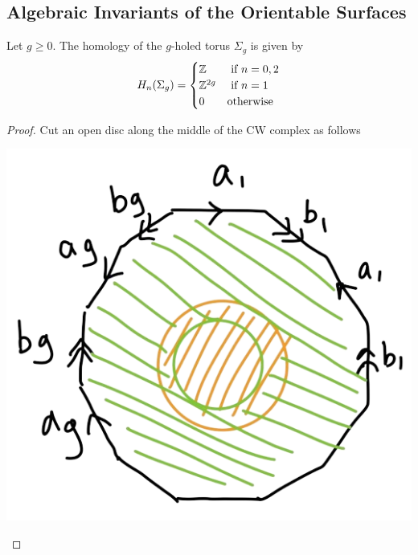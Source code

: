 \documentclass[a4paper]{article}
\begin{document}
\subsection{Algebraic Invariants of the Orientable Surfaces}
\begin{prp}{}{} Let $g\geq 0$. The homology of the $g$-holed torus $\Sigma_g$ is given by $$H_n(\Sigma_g)=\begin{cases}
\mathbb{Z} & \text{ if } n=0,2\\
\mathbb{Z}^{2g} & \text{ if } n=1\\
0 & \text{otherwise}
\end{cases}$$ \tcbline
\begin{proof}
Cut an open disc along the middle of the CW complex as follows

\begin{center}
\includegraphics[scale = 0.3]{Image 4}
\end{center}


\end{proof}
\end{prp}
\end{document}
